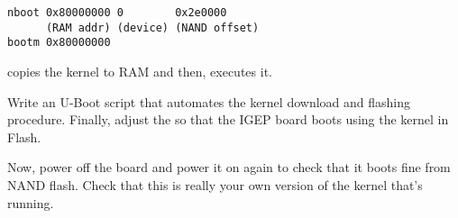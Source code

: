 \begin{verbatim}
nboot 0x80000000 0        0x2e0000
      (RAM addr) (device) (NAND offset)
bootm 0x80000000
\end{verbatim}

 copies the kernel to RAM and then,  executes
it.

Write an U-Boot script that automates the kernel download and flashing
procedure. Finally, adjust the  so that the IGEP board
boots using the kernel in Flash.

Now, power off the board and power it on again to check that it boots
fine from NAND flash. Check that this is really your own version of
the kernel that's running.
